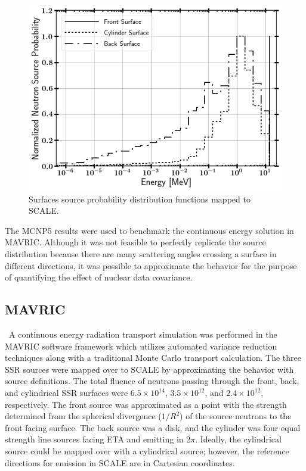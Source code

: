 \begin{figure}[htb!]
	\includegraphics[width=\linewidth]{Figures/Chapter3/RSSA_Spectrum.png}
	\caption{Surfaces source probability distribution functions mapped to SCALE.}
	\label{fig:RSSASpec}
\end{figure}

The MCNP5 results were used to benchmark the continuous energy solution in MAVRIC. 
Although it was not feasible to perfectly replicate the source distribution because there are many scattering angles crossing a surface in different directions, it was possible to approximate the behavior for the purpose of quantifying the effect of nuclear data covariance. 

\subsection{MAVRIC}\label{Benchmark}
\ A continuous energy radiation transport simulation was performed in the MAVRIC software framework which utilizes automated variance reduction techniques along with a traditional Monte Carlo transport calculation. 
The three SSR sources were mapped over to SCALE by approximating the behavior with source definitions. 
The total fluence of neutrons passing through the front, back, and cylindrical SSR surfaces were $6.5\times10^{14}$, $3.5\times10^{12}$, and $2.4\times10^{12}$, respectively. 
The front source was approximated as a point with the strength determined from the spherical divergence ($1/R^{2}$) of the source neutrons to the front facing surface.  
The back source was a disk, and the cylinder was four equal strength line sources facing ETA and emitting in 2$\pi$. 
Ideally, the cylindrical source could be mapped over with a cylindrical source; however, the reference directions for emission in SCALE are in Cartesian coordinates. 

